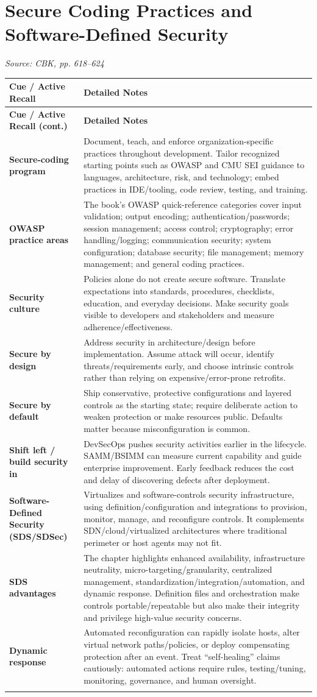 \documentclass[10pt,letterpaper]{article}
\makeatletter
\newenvironment{cornell}{\rowcolors{2}{white}{notebg}\begin{longtable}{@{}>{\raggedright\arraybackslash\columncolor{cuebg}\color{navy}\bfseries}p{0.285\textwidth}>{\raggedright\arraybackslash}p{0.65\textwidth}@{}}\rowcolor{navy}\color{white}\textbf{Cue / Active Recall} & \color{white}\textbf{Detailed Notes}\\ \hline\endfirsthead\rowcolor{navy}\color{white}\textbf{Cue / Active Recall (cont.)} & \color{white}\textbf{Detailed Notes}\\ \hline\endhead}{\end{longtable}}
\newcommand{\noterow}[2]{#1 & #2\\\arrayrulecolor{line}\hline}\newcommand{\source}[1]{\par{\footnotesize\color{teal}\textit{Source: CBK, #1}}\par}
\makeatother
\begin{document}
\section{\color{navy}Secure Coding Practices and Software-Defined Security}
\source{pp. 618--624}
\begin{cornell}
\noterow{Secure-coding program}{Document, teach, and enforce organization-specific practices throughout development. Tailor recognized starting points such as OWASP and CMU SEI guidance to languages, architecture, risk, and technology; embed practices in IDE/tooling, code review, testing, and training.}
\noterow{OWASP practice areas}{The book's OWASP quick-reference categories cover input validation; output encoding; authentication/passwords; session management; access control; cryptography; error handling/logging; communication security; system configuration; database security; file management; memory management; and general coding practices.}
\noterow{Security culture}{Policies alone do not create secure software. Translate expectations into standards, procedures, checklists, education, and everyday decisions. Make security goals visible to developers and stakeholders and measure adherence/effectiveness.}
\noterow{Secure by design}{Address security in architecture/design before implementation. Assume attack will occur, identify threats/requirements early, and choose intrinsic controls rather than relying on expensive/error-prone retrofits.}
\noterow{Secure by default}{Ship conservative, protective configurations and layered controls as the starting state; require deliberate action to weaken protection or make resources public. Defaults matter because misconfiguration is common.}
\noterow{Shift left / build security in}{DevSecOps pushes security activities earlier in the lifecycle. SAMM/BSIMM can measure current capability and guide enterprise improvement. Early feedback reduces the cost and delay of discovering defects after deployment.}
\noterow{Software-Defined Security (SDS/SDSec)}{Virtualizes and software-controls security infrastructure, using definition/configuration and integrations to provision, monitor, manage, and reconfigure controls. It complements SDN/cloud/virtualized architectures where traditional perimeter or host agents may not fit.}
\noterow{SDS advantages}{The chapter highlights enhanced availability, infrastructure neutrality, micro-targeting/granularity, centralized management, standardization/integration/automation, and dynamic response. Definition files and orchestration make controls portable/repeatable but also make their integrity and privilege high-value security concerns.}
\noterow{Dynamic response}{Automated reconfiguration can rapidly isolate hosts, alter virtual network paths/policies, or deploy compensating protection after an event. Treat ``self-healing'' claims cautiously: automated actions require rules, testing/tuning, monitoring, governance, and human oversight.}
\end{cornell}
\end{document}

